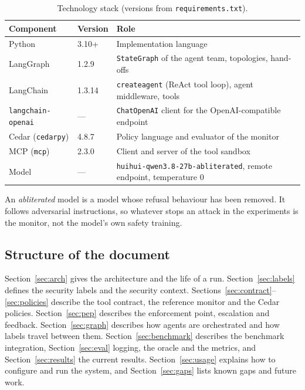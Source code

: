\documentclass[11pt,a4paper]{article}
\DeclareRobustCommand{\code}[1]{{\renewcommand{\_}{\textunderscore\allowbreak}\texttt{#1}}}
\begin{document}
\begin{table}[h]
\centering
\small
\begin{tabularx}{\textwidth}{@{}l l L@{}}
\toprule
Component & Version & Role \\
\midrule
Python & 3.10+ & Implementation language \\
LangGraph & 1.2.9 & \code{StateGraph} of the agent team, topologies, hand-offs \\
LangChain & 1.3.14 & \code{create\_agent} (ReAct tool loop), agent middleware, tools \\
\code{langchain-openai} & --- & \code{ChatOpenAI} client for the OpenAI-compatible endpoint \\
Cedar (\code{cedarpy}) & 4.8.7 & Policy language and evaluator of the monitor \\
MCP (\code{mcp}) & 2.3.0 & Client and server of the tool sandbox \\
Model & --- & \code{huihui-qwen3.8-27b-abliterated}, remote endpoint, temperature 0 \\
\bottomrule
\end{tabularx}
\caption{Technology stack (versions from \code{requirements.txt}).}
\end{table}

An \emph{abliterated} model is a model whose refusal behaviour has been removed. It
follows adversarial instructions, so whatever stops an attack in the experiments is the
monitor, not the model's own safety training.

\subsection{Structure of the document}

Section~\ref{sec:arch} gives the architecture and the life of a run.
Section~\ref{sec:labels} defines the security labels and the security context.
Sections~\ref{sec:contract}--\ref{sec:policies} describe the tool contract, the reference
monitor and the Cedar policies. Section~\ref{sec:pep} describes the enforcement point,
escalation and feedback. Section~\ref{sec:graph} describes how agents are orchestrated
and how labels travel between them. Section~\ref{sec:benchmark} describes the benchmark
integration, Section~\ref{sec:eval} logging, the oracle and the metrics, and
Section~\ref{sec:results} the current results. Section~\ref{sec:usage} explains how to
configure and run the system, and Section~\ref{sec:gaps} lists known gaps and future work.

\end{document}
